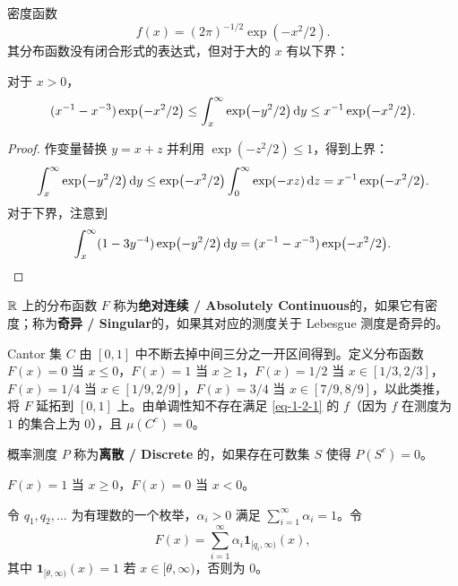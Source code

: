 \begin{example}
    密度函数
    \[
        f(x) = (2\pi)^{-1/2} \exp(-x^2/2).
    \]
    其分布函数没有闭合形式的表达式，但对于大的 $x$ 有以下界：
\end{example}

\begin{theorem}\label{theorem-1-2-6}
    对于 $x > 0$，
    \[
        (x^{-1} - x^{-3}) \exp(-x^2/2) \le \int_x^{\infty} \exp(-y^2/2) \,\mathrm{d} y \le x^{-1} \exp(-x^2/2).
    \]
\end{theorem}

\begin{proof}
    作变量替换 $y = x + z$ 并利用 $\exp(-z^2/2) \le 1$，得到上界：
    \[
        \int_x^{\infty} \exp(-y^2/2) \,\mathrm{d} y \le \exp(-x^2/2) \int_0^{\infty} \exp(-xz) \,\mathrm{d} z = x^{-1} \exp(-x^2/2).
    \]
    对于下界，注意到
    \[
        \int_x^{\infty} (1 - 3y^{-4}) \exp(-y^2/2) \,\mathrm{d} y = (x^{-1} - x^{-3}) \exp(-x^2/2). \qedhere
    \]
\end{proof}

$\mathbb{R}$ 上的分布函数 $F$ 称为{\normalfont\bfseries 绝对连续 / Absolutely Continuous}的，如果它有密度；称为{\normalfont\bfseries 奇异 / Singular}的，如果其对应的测度关于 Lebesgue 测度是奇异的。

\begin{example}
    Cantor 集 $C$ 由 $[0,1]$ 中不断去掉中间三分之一开区间得到。定义分布函数 $F(x) = 0$ 当 $x \le 0$，$F(x) = 1$ 当 $x \ge 1$，$F(x) = 1/2$ 当 $x \in [1/3,2/3]$，$F(x) = 1/4$ 当 $x \in [1/9,2/9]$，$F(x) = 3/4$ 当 $x \in [7/9,8/9]$，以此类推，将 $F$ 延拓到 $[0,1]$ 上。由单调性知不存在满足 \eqref{eq-1-2-1} 的 $f$（因为 $f$ 在测度为 $1$ 的集合上为 $0$），且 $\mu(C^c) = 0$。
\end{example}

概率测度 $P$ 称为{\normalfont\bfseries 离散 / Discrete} 的，如果存在可数集 $S$ 使得 $P(S^c) = 0$。

\begin{example}
    $F(x) = 1$ 当 $x \ge 0$，$F(x) = 0$ 当 $x < 0$。
\end{example}

\begin{example}
    令 $q_1, q_2, \dots$ 为有理数的一个枚举，$\alpha_i > 0$ 满足 $\sum_{i=1}^{\infty} \alpha_i = 1$。令
    \[
        F(x) = \sum_{i=1}^{\infty} \alpha_i \mathbf{1}_{[q_i,\infty)}(x),
    \]
    其中 $\mathbf{1}_{[\theta,\infty)}(x) = 1$ 若 $x \in [\theta,\infty)$，否则为 $0$。
\end{example}

